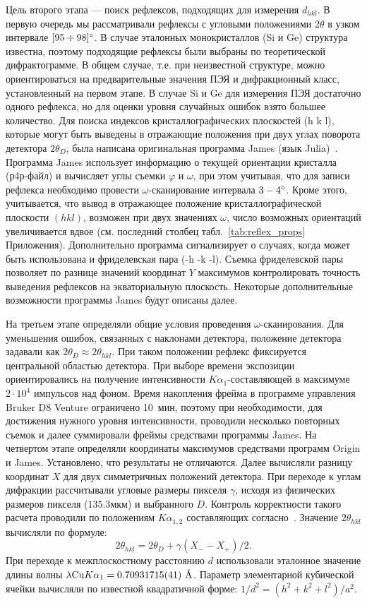 Цель второго этапа --- поиск рефлексов, подходящих для измерения $d_{hkl}$.
В первую очередь мы рассматривали рефлексы с угловыми положениями $2\theta$ в узком интервале $[95\div98]^\circ$.
В случае эталонных монокристаллов (Si и Ge) структура известна, поэтому подходящие рефлексы были выбраны по теоретической дифрактограмме.
В общем случае, т.е. при неизвестной структуре, можно ориентироваться на предварительные значения ПЭЯ и дифракционный класс, установленный на первом этапе.
В случае Si и Ge для измерения ПЭЯ достаточно одного рефлекса, но для оценки уровня случайных ошибок взято большее количество.
Для поиска индексов кристаллографических плоскостей \hkl(h k l), которые могут быть выведены в отражающие положения при двух углах поворота детектора $2\theta_D$, была написана оригинальная программа James (язык Julia)~\cite{James}.
Программа James использует информацию о текущей ориентации кристалла (р4р-файл) и вычисляет углы съемки $\varphi$ и $\omega$, при этом учитывая, что для записи рефлекса необходимо провести $\omega$-сканирование интервала $3-4^\circ$.
Кроме этого, учитывается, что вывод в отражающее положение кристаллографической плоскости $(h k l)$, возможен при двух значениях $\omega$, число возможных ориентаций увеличивается вдвое (см. последний столбец табл.~\ref{tab:reflex_props} Приложения).
Дополнительно программа сигнализирует о случаях, когда может быть использована и фриделевская пара \hkl(-h -k -l).
Съемка фриделевской пары позволяет по разнице значений координат $Y$ максимумов контролировать точность выведения рефлексов на экваториальную плоскость.
Некоторые дополнительные возможности программы James будут описаны далее.

На третьем этапе определяли общие условия проведения $\omega$-сканирования.
Для уменьшения ошибок, связанных с наклонами детектора, положение детектора задавали как $2\theta_D \approx 2\theta_{hkl}$.
При таком положении рефлекс фиксируется центральной областью детектора.
При выборе времени экспозиции ориентировались на получение интенсивности $K\alpha_1$-составляющей в максимуме $2 \cdot 10^4$ импульсов над фоном.
Время накопления фрейма в программе управления Bruker D8 Venture ограничено 10~мин, поэтому при необходимости, для достижения нужного уровня интенсивности, проводили несколько повторных съемок и далее суммировали фреймы средствами программы James. 
На четвертом этапе определяли координаты максимумов средствами программ Origin и James. Установлено, что результаты не отличаются.
Далее вычисляли разницу координат $X$ для двух симметричных положений детектора.
При переходе к углам дифракции рассчитывали угловые размеры пикселя $\gamma$, исходя из физических размеров пикселя ($135.3\unit{мкм}$) и выбранного $D$.
Контроль корректности такого расчета проводили по положениям $K\alpha_{1,2}$ составляющих согласно~\cite{Gromilov:2022}. 
Значение $2\theta_{hkl}$ вычисляли по формуле:
\begin{equation}\label{eq:bond2}
    2\theta_{hkl} = 2\theta_D + \gamma (X_- - X_+) / 2.
\end{equation}
При переходе к межплоскостному расстоянию $d$ использовали эталонное значение длины волны $\lambda \text{Cu} K\alpha_1 = 0.70931715(41)\ \text{\AA}$.
Параметр элементарной кубической ячейки вычисляли по известной квадратичной форме: $1/d^2 = (h^2 + k^2 +l^2)/a^2$.
